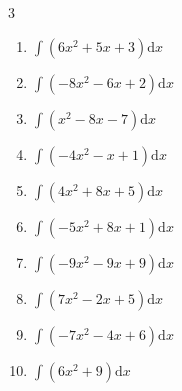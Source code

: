 \begin{multicols}{3}
\begin{enumerate}

\columnbreak %

\resetques

  \item $\displaystyle \int \left( 6x^{2}+5x+3 \right) \mathrm{d}x$


  \item $\displaystyle \int \left( -8x^{2}-6x+2 \right) \mathrm{d}x$


  \item $\displaystyle \int \left( x^{2}-8x-7 \right) \mathrm{d}x$


  \item $\displaystyle \int \left( -4x^{2}-x+1 \right) \mathrm{d}x$


  \item $\displaystyle \int \left( 4x^{2}+8x+5 \right) \mathrm{d}x$


  \item $\displaystyle \int \left( -5x^{2}+8x+1 \right) \mathrm{d}x$


  \item $\displaystyle \int \left( -9x^{2}-9x+9 \right) \mathrm{d}x$


  \item $\displaystyle \int \left( 7x^{2}-2x+5 \right) \mathrm{d}x$


  \item $\displaystyle \int \left( -7x^{2}-4x+6 \right) \mathrm{d}x$


  \item $\displaystyle \int \left( 6x^{2}+9 \right) \mathrm{d}x$


\end{enumerate}
\end{multicols}
